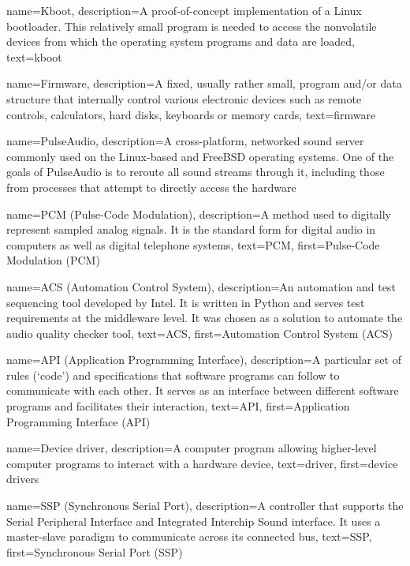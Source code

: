 {
  name=Kboot,
  description={A proof-of-concept implementation of a Linux
    bootloader. This relatively small program is needed to access the
    nonvolatile devices from which the operating system programs and
    data are loaded},
  text=kboot
}

{
  name=Firmware,
  description={A fixed, usually rather small, program and/or data
    structure that internally control various electronic devices such
    as remote controls, calculators, hard disks, keyboards or memory
    cards},
  text=firmware
}


{
  name=PulseAudio,
  description={A cross-platform, networked sound server commonly used
    on the Linux-based and FreeBSD operating systems. One of the goals
    of PulseAudio is to reroute all sound streams through it,
    including those from processes that attempt to directly access the
    hardware}
}

{
  name=PCM (Pulse-Code Modulation),
  description={A method used to digitally represent sampled analog
    signals. It is the standard form for digital audio in computers as
    well as digital telephone systems},
  text=PCM,
  first=Pulse-Code Modulation (PCM)
}

{
  name=ACS (Automation Control System),
  description={An automation and test sequencing tool developed by
    Intel. It is written in Python and serves test requirements at the
    middleware level. It was chosen as a solution to automate the
    audio quality checker tool},
  text=ACS,
  first=Automation Control System (ACS)
}

{
  name=API (Application Programming Interface),
  description={A particular set of rules (`code') and specifications
    that software programs can follow to communicate with each
    other. It serves as an interface between different software
    programs and facilitates their interaction},
  text=API,
  first=Application Programming Interface (API)
}

{
  name=Device driver,
  description={A computer program allowing higher-level computer
    programs to interact with a hardware device},
  text=driver,
  first=device drivers
}

{
  name=SSP (Synchronous Serial Port),
  description={A controller that supports the Serial Peripheral
    Interface and Integrated Interchip Sound interface. It uses a
    master-slave paradigm to communicate across its connected bus},
  text=SSP,
  first=Synchronous Serial Port (SSP)
}


